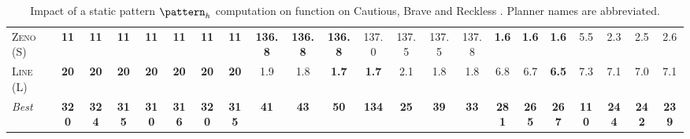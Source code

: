 \documentclass[11pt,landscape]{article}
\begin{document}
\begin{table}[tb]
{\begin{tabular}{|l||ccccccc||ccccccc||ccccccc||}
\textsc{Zeno} (S)&\textbf{11}&\textbf{11}&\textbf{11}&\textbf{11}&\textbf{11}&\textbf{11}&\textbf{11}&\textbf{136.8}&\textbf{136.8}&\textbf{136.8}&137.0&137.5&137.5&137.8&\textbf{1.6}&\textbf{1.6}&\textbf{1.6}&5.5&2.3&2.5&2.6\\
\textsc{Line} (L)&\textbf{20}&\textbf{20}&\textbf{20}&\textbf{20}&\textbf{20}&\textbf{20}&\textbf{20}&1.9&1.8&\textbf{1.7}&\textbf{1.7}&2.1&1.8&1.8&6.8&6.7&\textbf{6.5}&7.3&7.1&7.0&7.1
\\\hline
\textit{Best}&\textbf{320}&\textbf{324}&\textbf{315}&\textbf{310}&\textbf{316}&\textbf{320}&\textbf{315}&\textbf{41}&\textbf{43}&\textbf{50}&\textbf{134}&\textbf{25}&\textbf{39}&\textbf{33}&\textbf{281}&\textbf{265}&\textbf{267}&\textbf{110}&\textbf{244}&\textbf{242}&\textbf{239}\\\hline

        \end{tabular}}
        \caption{Impact of a static pattern $\pattern_h$ computation on function on Cautious, Brave and Reckless \pattyd. Planner names are abbreviated.}
        \label{tab:abl-patternh-static}
        \end{table}
        
\end{document}
